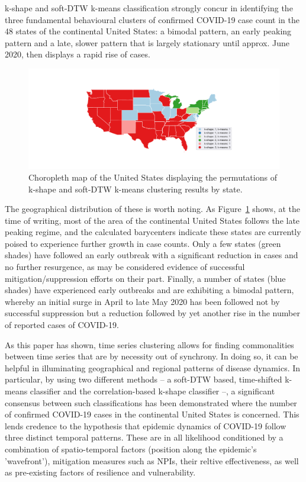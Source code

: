 \documentclass{article}
\begin{document}
k-shape and soft-DTW k-means classification strongly concur in identifying the three fundamental behavioural clusters of confirmed COVID-19 case count in the 48 states of the continental United States: a bimodal pattern, an early peaking pattern and a late, slower pattern that is largely stationary until approx. June 2020, then displays a rapid rise of cases.

\begin{figure}
	\includegraphics[width=\linewidth]{figures/branch_choropleth}
	\centering
	\caption{Choropleth map of the United States displaying the permutations of k-shape and soft-DTW k-means clustering results by state.}
	\label{fig:choropleth}
\end{figure}

The geographical distribution of these is worth noting. As Figure~\ref{fig:choropleth} shows, at the time of writing, most of the area of the continental United States follows the late peaking regime, and the calculated barycenters indicate these states are currently poised to experience further growth in case counts. Only a few states (green shades) have followed an early outbreak with a significant reduction in cases and no further resurgence, as may be considered evidence of successful mitigation/suppression efforts on their part. Finally, a number of states (blue shades) have experienced early outbreaks and are exhibiting a bimodal pattern, whereby an initial surge in April to late May 2020 has been followed not by successful suppression but a reduction followed by yet another rise in the number of reported cases of COVID-19.

As this paper has shown, time series clustering allows for finding commonalities between time series that are by necessity out of synchrony. In doing so, it can be helpful in illuminating geographical and regional patterns of disease dynamics. In particular, by using two different methods -- a soft-DTW based, time-shifted k-means classifier and the correlation-based k-shape classifier --, a significant consensus between such classifications has been demonstrated where the number of confirmed COVID-19 cases in the continental United States is concerned. This lends credence to the hypothesis that epidemic dynamics of COVID-19 follow three distinct temporal patterns. These are in all likelihood conditioned by a combination of spatio-temporal factors (position along the epidemic's 'wavefront'), mitigation measures such as NPIs, their reltive effectiveness, as well as pre-existing factors of resilience and vulnerability.
\end{document}
